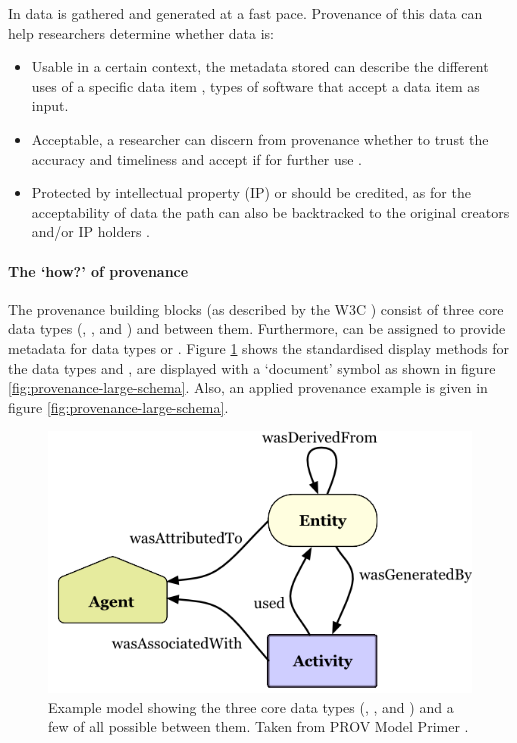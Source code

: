 In \escience{} data is gathered and generated at a fast pace.
Provenance of this data can help researchers determine whether data is:

\begin{itemize}
	\item Usable in a certain context, the metadata stored can describe the different uses of a specific data item \cite{dsp1simmhan}, \eg{} types of software that accept a data item as input.
	\item Acceptable, a researcher can discern from provenance whether to trust the accuracy and timeliness and accept if for further use \cite{dsp1simmhan,dsp3buneman}.
	\item Protected by intellectual property (IP) or should be credited, as for the acceptability of data the path can also be backtracked to the original creators and/or IP holders \cite{dsp1simmhan}.
\end{itemize}

\paragraph{The `how?' of provenance}
\label{provenance-how}

The provenance building blocks (as described by the W3C \cite{dsp8gil}) consist of three core data types (\agent{}, \entity{}, and \activity{}) and \relations{} between them.
Furthermore, \attributes{} can be assigned to provide metadata for data types or \relations{}.
Figure \ref{fig:provenance-overview} shows the standardised display methods for the data types and \relations{}, \attributes{} are displayed with a `document' symbol as shown in figure \ref{fig:provenance-large-schema}.
Also, an applied provenance example is given in figure \ref{fig:provenance-large-schema}.

\begin{figure}[!t]
	\centering
	\includegraphics[width=0.5\linewidth]{images/provenance-overview}
	\caption{
		Example model showing the three core data types (\agent{}, \entity{}, and \activity{}) and a few of all possible \relations{} between them. 
		Taken from PROV Model Primer \cite{dsp8gil}.}
	\label{fig:provenance-overview}
\end{figure}

